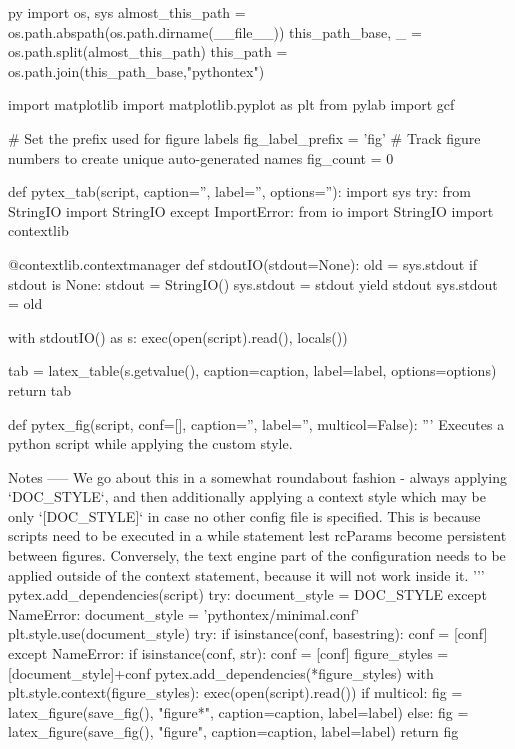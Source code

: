 \begin{pythontexcustomcode}[begin]{py}
import os, sys
almost_this_path = os.path.abspath(os.path.dirname(__file__))
this_path_base, _ = os.path.split(almost_this_path)
this_path = os.path.join(this_path_base,"pythontex")

import matplotlib
import matplotlib.pyplot as plt
from pylab import gcf

# Set the prefix used for figure labels
fig_label_prefix = 'fig'
# Track figure numbers to create unique auto-generated names
fig_count = 0

def pytex_tab(script, caption='', label='', options=''):
    import sys
    try:
        from StringIO import StringIO
    except ImportError:
        from io import StringIO
    import contextlib

    @contextlib.contextmanager
    def stdoutIO(stdout=None):
        old = sys.stdout
        if stdout is None:
            stdout = StringIO()
        sys.stdout = stdout
        yield stdout
        sys.stdout = old

    with stdoutIO() as s:
        exec(open(script).read(), locals())

    tab = latex_table(s.getvalue(), caption=caption, label=label, options=options)
    return tab

def pytex_fig(script, conf=[], caption='', label='', multicol=False):
    '''
    Executes a python script while applying the custom style.

    Notes
    -----
    We go about this in a somewhat roundabout fashion - always applying `DOC_STYLE`, and then additionally applying a context style which may be only `[DOC_STYLE]` in case no other config file is specified.
    This is because scripts need to be executed in a while statement lest rcParams become persistent between figures.
    Conversely, the text engine part of the configuration needs to be applied outside of the context statement, because it will not work inside it.
    '''
    pytex.add_dependencies(script)
    try:
        document_style = DOC_STYLE
    except NameError:
        document_style = 'pythontex/minimal.conf'
    plt.style.use(document_style)
    try:
        if isinstance(conf, basestring):
            conf = [conf]
    except NameError:
        if isinstance(conf, str):
            conf = [conf]
    figure_styles = [document_style]+conf
    pytex.add_dependencies(*figure_styles)
    with plt.style.context(figure_styles):
        exec(open(script).read())
    if multicol:
        fig = latex_figure(save_fig(), "figure*", caption=caption, label=label)
    else:
        fig = latex_figure(save_fig(), "figure", caption=caption, label=label)
    return fig


\end{pythontexcustomcode}
